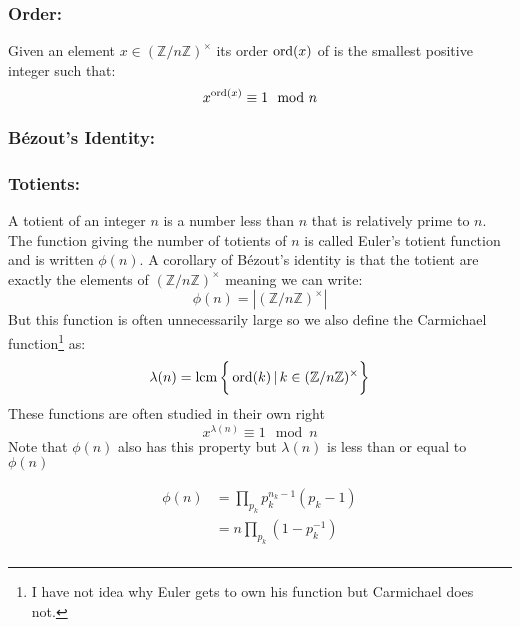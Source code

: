 \subsubsection{Order:}
Given an element $x\in(\mathbb{Z}/n\mathbb{Z})^\times$ its order $\operatorname{ord}(x)$ of  is the smallest positive integer such that:
\[x^{\operatorname{ord}(x)}\equiv 1 \mod n\]

\subsubsection{Bézout’s Identity:}


\subsubsection{Totients:}
A totient of an integer $n$ is a number less than $n$ that is relatively prime to $n$.
The function giving the number of totients of $n$ is called Euler's totient function and is written $\phi(n)$.
A corollary of Bézout’s identity is that the totient are exactly the elements of $(\mathbb{Z}/n\mathbb{Z})^\times$ meaning we can write:
\[\phi(n) = |(\mathbb{Z}/n\mathbb{Z})^\times|\]
But this function is often unnecessarily large so we also define the Carmichael function\footnote{I have not idea why Euler gets to own his function but Carmichael does not.} as:
\[\lambda(n) = \operatorname{lcm}\bigg\{\operatorname{ord}(k)\,|\, k\in(\mathbb{Z}/n\mathbb{Z})^\times\bigg\}\]
These functions are often studied in their own right
\[x^{\lambda(n)}\equiv 1 \mod n\]
Note that $\phi(n)$ also has this property but $\lambda(n)$ is less than or equal to $\phi(n)$

\[\begin{aligned}	
	\phi(n) &= \prod_{p_k}p_k^{n_k-1}(p_k-1)\\
	&= n\prod_{p_k}(1-p_k^{-1})\\
\end{aligned}\]
